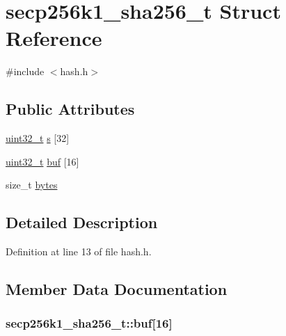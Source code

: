 \hypertarget{structsecp256k1__sha256__t}{}\section{secp256k1\+\_\+sha256\+\_\+t Struct Reference}
\label{structsecp256k1__sha256__t}


{\ttfamily \#include $<$hash.\+h$>$}

\subsection*{Public Attributes}
\begin{DoxyCompactItemize}
\item 
\hyperlink{stdint_8h_a435d1572bf3f880d55459d9805097f62}{uint32\+\_\+t} \hyperlink{structsecp256k1__sha256__t_ae795b4d52e123353b971540e366ca9cd}{s} \mbox{[}32\mbox{]}
\item 
\hyperlink{stdint_8h_a435d1572bf3f880d55459d9805097f62}{uint32\+\_\+t} \hyperlink{structsecp256k1__sha256__t_a95b02d7e4d8902c1998f8ebb598a9168}{buf} \mbox{[}16\mbox{]}
\item 
size\+\_\+t \hyperlink{structsecp256k1__sha256__t_aa427890685bc0a6db0e892d08b1918b8}{bytes}
\end{DoxyCompactItemize}


\subsection{Detailed Description}


Definition at line 13 of file hash.\+h.



\subsection{Member Data Documentation}
\hypertarget{structsecp256k1__sha256__t_a95b02d7e4d8902c1998f8ebb598a9168}{}
\subsubsection[{buf}]{ secp256k1\+\_\+sha256\+\_\+t\+::buf\mbox{[}16\mbox{]}}\label{structsecp256k1__sha256__t_a95b02d7e4d8902c1998f8ebb598a9168}


